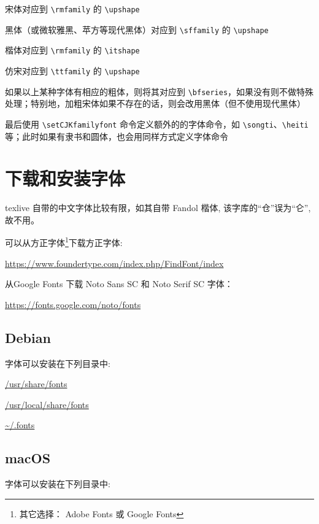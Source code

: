 \begin{compactitems}
  \item 宋体对应到 \verb|\rmfamily| 的 \verb|\upshape|
  \item 黑体（或微软雅黑、苹方等现代黑体）对应到 \verb|\sffamily| 的 \verb|\upshape|
  \item 楷体对应到 \verb|\rmfamily| 的 \verb|\itshape|
  \item 仿宋对应到 \verb|\ttfamily| 的 \verb|\upshape|
  \item 如果以上某种字体有相应的粗体，则将其对应到 \verb|\bfseries|，如果没有则不做特殊处理；特别地，加粗宋体如果不存在的话，则会改用黑体（但不使用现代黑体）
  \item 最后使用 \verb|\setCJKfamilyfont| 命令定义额外的的字体命令，如 \verb|\songti|、\verb|\heiti| 等；此时如果有隶书和圆体，也会用同样方式定义字体命令
\end{compactitems}

\section{下载和安装字体}

texlive 自带的中文字体比较有限，如其自带 Fandol 楷体, 该字库的“仓”误为“仑”, 故不用。

可以从方正字体\footnote{其它选择： Adobe Fonts 或 Google Fonts}下载方正字体:

\url{https://www.foundertype.com/index.php/FindFont/index}

从Google Fonts 下载 Noto Sans SC 和 Noto Serif SC 字体：

\url{https://fonts.google.com/noto/fonts}

\subsection{Debian}

字体可以安装在下列目录中:

\begin{compactitems}
  \item \url{/usr/share/fonts}
  \item \url{/usr/local/share/fonts}
  \item \url{~/.fonts}
\end{compactitems}

\subsection{macOS}

字体可以安装在下列目录中:

